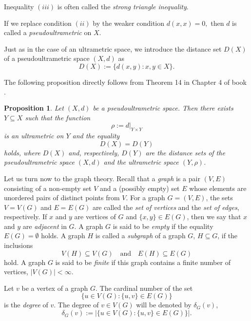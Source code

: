 \documentclass[pdflatex,sn-mathphys-num]{sn-jnl}%
\theoremstyle{thmstyleone}%
\newtheorem{Proposition}[Theorem]{Proposition}
\theoremstyle{thmstyletwo}%
\theoremstyle{thmstylethree}%
\theoremstyle{thmstyletwo}%
\theoremstyle{thmstylethree}%
\begin{document}
Inequality $(iii)$ is often called the {\it strong triangle inequality}. 


If we replace condition $(ii)$ by the weaker condition
   $ d(x,x)=0,$
then $d$ is called a {\it pseudoultrametric} on $X$.







Just as in the case of an ultrametric space, we introduce  the distance set $D(X)$ of a pseudoultrametric space $(X,d)$ as
\[
D(X) := \{ d(x,y) : x,y \in X \}.
\]




The following proposition directly follows from Theorem 14 in Chapter 4 of book \cite{Kelley1965}.






\begin{Proposition}\label{dxo} Let $(X,d)$ be a pseudoultrametric space. Then there exists $Y \subseteq X$ such that the function
\[
\rho:=d|_{Y\times Y}
\]
is an ultrametric on $Y$ and the equality
\[
D(X) = D(Y)
\]
holds, where $D(X)$ and, respectively, $D(Y)$ are the distance sets of the pseudoultrametric space $(X,d)$ and the ultrametric space $(Y,\rho)$.
\end{Proposition}










Let us turn now to the graph theory.
  Recall that a {\it graph} is a pair $(V,E)$ consisting of a non-empty set $V$ and a (possibly empty) set $E$ whose elements are unordered pairs of distinct points from $V$.
For a graph $G=(V,E)$, the sets $V=V(G)$ and $E=E(G)$ are called the {\it set of vertices} and the {\it set of edges}, respectively. If $x$ and $y$ are vertices of $G$ and $\{x,y\}\in E(G)$, then we say that $x$ and $y$ are {\it adjacent} in $G$. A graph $G$ is said to be {\it empty} if the equality $E(G)=\emptyset$ holds. A graph $H$ is called a {\it subgraph} of a graph $G$, $H \subseteq G$, if the inclusions
\[
V(H) \subseteq V(G) \quad \text{and} \quad E(H) \subseteq E(G)
\] 
hold. A graph $G$ is said to be {\it finite} if this graph contains a finite number of vertices, $|V(G)| < \infty$.

Let $v$ be a vertex of a graph $G$. The cardinal number of the set
\[
\{u \in V(G) : \{u,v\} \in E(G)\}
\]
is the {\it degree} of $v$. The degree of $v\in V(G)$ will be denoted by $\delta_G(v)$,
\begin{equation}
    \label{mmks}
\delta_G(v) := \left|\{u \in V(G) : \{u,v\} \in E(G)\}\right|.
\end{equation}
\end{document}
